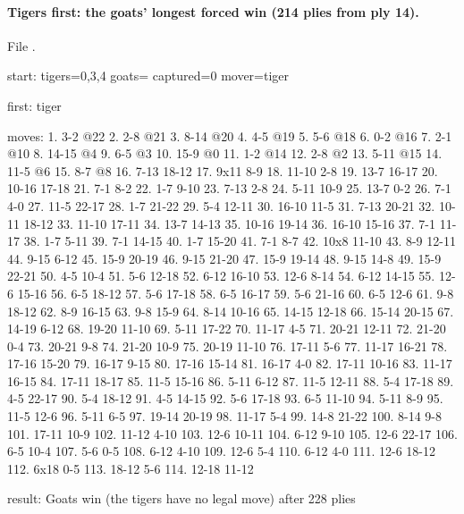 \paragraph{Tigers first: the goats' longest forced win (214 plies from ply 14).} File .
\begin{gamelisting}
start: tigers=0,3,4 goats= captured=0 mover=tiger\par
first: tiger\par
moves: 1. 3-2 @22 2. 2-8 @21 3. 8-14 @20 4. 4-5 @19 5. 5-6 @18 6. 0-2 @16 7. 2-1 @10 8. 14-15 @4 9. 6-5 @3 10. 15-9 @0 11. 1-2 @14 12. 2-8 @2 13. 5-11 @15 14. 11-5 @6 15. 8-7 @8 16. 7-13 18-12 17. 9x11 8-9 18. 11-10 2-8 19. 13-7 16-17 20. 10-16 17-18 21. 7-1 8-2 22. 1-7 9-10 23. 7-13 2-8 24. 5-11 10-9 25. 13-7 0-2 26. 7-1 4-0 27. 11-5 22-17 28. 1-7 21-22 29. 5-4 12-11 30. 16-10 11-5 31. 7-13 20-21 32. 10-11 18-12 33. 11-10 17-11 34. 13-7 14-13 35. 10-16 19-14 36. 16-10 15-16 37. 7-1 11-17 38. 1-7 5-11 39. 7-1 14-15 40. 1-7 15-20 41. 7-1 8-7 42. 10x8 11-10 43. 8-9 12-11 44. 9-15 6-12 45. 15-9 20-19 46. 9-15 21-20 47. 15-9 19-14 48. 9-15 14-8 49. 15-9 22-21 50. 4-5 10-4 51. 5-6 12-18 52. 6-12 16-10 53. 12-6 8-14 54. 6-12 14-15 55. 12-6 15-16 56. 6-5 18-12 57. 5-6 17-18 58. 6-5 16-17 59. 5-6 21-16 60. 6-5 12-6 61. 9-8 18-12 62. 8-9 16-15 63. 9-8 15-9 64. 8-14 10-16 65. 14-15 12-18 66. 15-14 20-15 67. 14-19 6-12 68. 19-20 11-10 69. 5-11 17-22 70. 11-17 4-5 71. 20-21 12-11 72. 21-20 0-4 73. 20-21 9-8 74. 21-20 10-9 75. 20-19 11-10 76. 17-11 5-6 77. 11-17 16-21 78. 17-16 15-20 79. 16-17 9-15 80. 17-16 15-14 81. 16-17 4-0 82. 17-11 10-16 83. 11-17 16-15 84. 17-11 18-17 85. 11-5 15-16 86. 5-11 6-12 87. 11-5 12-11 88. 5-4 17-18 89. 4-5 22-17 90. 5-4 18-12 91. 4-5 14-15 92. 5-6 17-18 93. 6-5 11-10 94. 5-11 8-9 95. 11-5 12-6 96. 5-11 6-5 97. 19-14 20-19 98. 11-17 5-4 99. 14-8 21-22 100. 8-14 9-8 101. 17-11 10-9 102. 11-12 4-10 103. 12-6 10-11 104. 6-12 9-10 105. 12-6 22-17 106. 6-5 10-4 107. 5-6 0-5 108. 6-12 4-10 109. 12-6 5-4 110. 6-12 4-0 111. 12-6 18-12 112. 6x18 0-5 113. 18-12 5-6 114. 12-18 11-12\par
result: Goats win (the tigers have no legal move) after 228 plies\par
\end{gamelisting}

